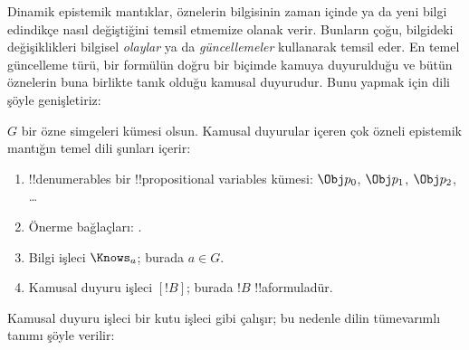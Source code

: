 \documentclass[../../../include/open-logic-section]{subfiles}
\begin{document}


Dinamik epistemik mantıklar, öznelerin bilgisinin zaman içinde ya da yeni
bilgi edindikçe nasıl değiştiğini temsil etmemize olanak verir. Bunların
çoğu, bilgideki değişiklikleri bilgisel \emph{olaylar} ya da
\emph{güncellemeler} kullanarak temsil eder. En temel güncelleme türü, bir
formülün doğru bir biçimde kamuya duyurulduğu ve bütün öznelerin buna birlikte
tanık olduğu kamusal duyurudur. Bunu yapmak için dili şöyle genişletiriz:

\begin{defn}
$G$ bir özne simgeleri kümesi olsun. Kamusal duyurular içeren çok özneli
epistemik mantığın temel dili şunları içerir:
\begin{enumerate}
  \item !!{denumerable}s bir !!{propositional variable}s kümesi: $\Obj
    p_0$, $\Obj p_1$, $\Obj p_2$, \dots
  \item Önerme bağlaçları: \startycommalist
  .
  \item Bilgi işleci $\Knows_a$; burada $a \in G$.
  \item Kamusal duyuru işleci $[!B]$; burada $!B$ !!a{formula}{}dür.
\end{enumerate}
\end{defn}

Kamusal duyuru işleci bir kutu işleci gibi çalışır; bu nedenle dilin
tümevarımlı tanımı şöyle verilir:
\end{document}
